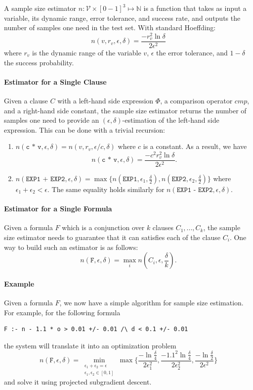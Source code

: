 \documentclass{article}
\begin{document}
A sample size estimator $n: \mathcal{V} \times [0-1]^3 \mapsto \mathbb{N}$ is a function that takes as input
a variable, its dynamic range, error tolerance, and
success rate, and outputs the number of samples 
one need in the test set. With standard Hoeffding:
\[
n(v, r_v, \epsilon, \delta) = \frac{-r_v^2 \ln \delta}{2\epsilon^2}
\]
where $r_v$ is the dynamic range of the variable 
$v$, $\epsilon$ the error tolerance, and 
$1-\delta$ the success probability.

\paragraph*{Estimator for a Single Clause}

Given a clause $C$ with a left-hand side expression
$\Phi$, a comparison operator $cmp$, and a right-hand
side constant, the sample size estimator returns the
number of samples one need to provide an 
$(\epsilon, \delta)$-estimation of the left-hand side 
expression. This can be done with a 
trivial recursion:
\begin{enumerate}
\item $n(\texttt{c * v}, \epsilon, \delta) = n(v, r_v, \epsilon / c, \delta)$ where $c$ is a constant. As a result, we have
\[
n(\texttt{c * v}, \epsilon, \delta) = \frac{- c^2 r_v^2 \ln \delta}{2\epsilon^2}.
\]
\item $n(\texttt{EXP1 + EXP2}, \epsilon, \delta) =
   \max \{n(\texttt{EXP1}, \epsilon_1, \frac{\delta}{2}),
          n(\texttt{EXP2}, \epsilon_2, \frac{\delta}{2})\}$
where $\epsilon_1 + \epsilon_2 < \epsilon$. The same
equality holds similarly for
$n(\texttt{EXP1 - EXP2}, \epsilon, \delta)$.
\end{enumerate}

\paragraph*{Estimator for a Single Formula}

Given a formula $F$ which is a conjunction over
$k$ clauses ${C_1, ..., C_k}$, the sample size
estimator needs to guarantee that it can 
satisfies each of the clause $C_i$. One way
to build such an estimator is as follows:
\[
n(\texttt{F}, \epsilon, \delta) = \max_i n(C_i, \epsilon, \frac{\delta}{k}).
\]

\paragraph*{Example} Given a formula $F$, we now have a simple algorithm for sample size estimation. 
For example, for the following formula 
\begin{verbatim}
F :- n - 1.1 * o > 0.01 +/- 0.01 /\ d < 0.1 +/- 0.01    
\end{verbatim}
the system will translate it into an
optimization problem
\[
n(\texttt{F}, \epsilon, \delta) = 
\min_{\substack{
\epsilon_1 + \epsilon_2 = \epsilon\\ \epsilon_1, \epsilon_2 \in [0, 1]}}
\max\{
\frac{- \ln \frac{\delta}{4}}{2\epsilon_1^2},
\frac{- 1.1^2 \ln \frac{\delta}{4}}{2\epsilon_2^2},
\frac{- \ln \frac{\delta}{2}}{2\epsilon^2}
\}
\]
and solve it using projected subgradient descent.
\end{document}
